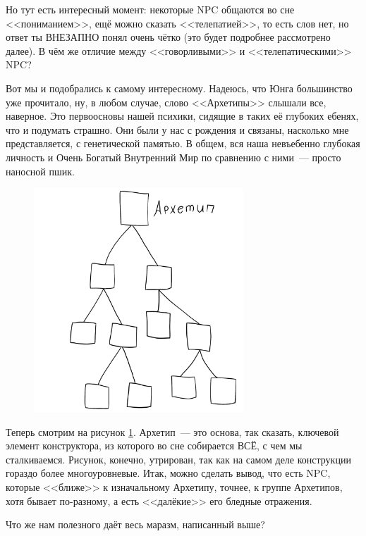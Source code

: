 \documentclass[a4paper,14pt,oneside]{memoir}
\begin{document}
Но тут есть интересный момент: некоторые NPC общаются во сне <<пониманием>>, ещё можно сказать <<телепатией>>, то есть слов нет, но ответ ты ВНЕЗАПНО понял очень чётко (это будет подробнее рассмотрено далее). В чём же отличие между <<говорливыми>> и <<телепатическими>> NPC?

Вот мы и подобрались к самому интересному. Надеюсь, что Юнга большинство уже прочитало, ну, в любом случае, слово <<Архетипы>> слышали все, наверное. Это первоосновы нашей психики, сидящие в таких её глубоких ебенях, что и подумать страшно. Они были у нас с рождения и связаны, насколько мне представляется, с генетической памятью. В общем, вся наша невъебенно глубокая личность и Очень Богатый Внутренний Мир по сравнению с ними~--- просто наносной пшик.
 
\begin{figure}[h!]
\begin{center}
\includegraphics[width=0.7\textwidth]{ris81.png}
\end{center}
\caption{}
\label{archt}
\end{figure}

Теперь смотрим на рисунок \ref{archt}. Архетип~--- это основа, так сказать, ключевой элемент конструктора, из которого во сне собирается ВСЁ, с чем мы сталкиваемся. Рисунок, конечно, утрирован, так как на самом деле конструкции гораздо более многоуровневые. Итак, можно сделать вывод, что есть NPC, которые <<ближе>> к изначальному Архетипу, точнее, к группе Архетипов, хотя бывает по-разному, а есть <<далёкие>> его бледные отражения.

Что же нам полезного даёт весь маразм, написанный выше?
\end{document}
